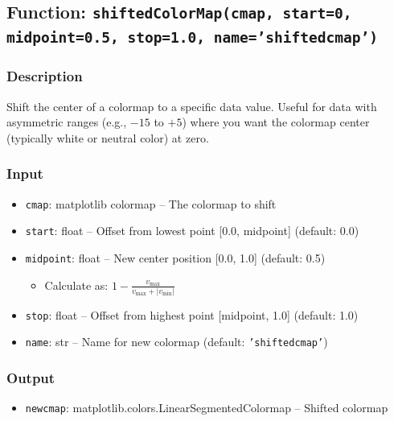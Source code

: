\documentclass[11pt,a4paper]{article}
\begin{document}
\subsection{Function: \texttt{shiftedColorMap(cmap, start=0, midpoint=0.5, stop=1.0, name='shiftedcmap')}}

\subsubsection{Description}
Shift the center of a colormap to a specific data value. Useful for data with asymmetric ranges (e.g., $-15$ to $+5$) where you want the colormap center (typically white or neutral color) at zero.

\subsubsection{Input}
\begin{itemize}[leftmargin=*]
    \item \texttt{cmap}: matplotlib colormap -- The colormap to shift
    \item \texttt{start}: float -- Offset from lowest point [0.0, midpoint] (default: 0.0)
    \item \texttt{midpoint}: float -- New center position [0.0, 1.0] (default: 0.5)
    \begin{itemize}
        \item Calculate as: $1 - \frac{v_{\max}}{v_{\max} + |v_{\min}|}$
    \end{itemize}
    \item \texttt{stop}: float -- Offset from highest point [midpoint, 1.0] (default: 1.0)
    \item \texttt{name}: str -- Name for new colormap (default: \texttt{'shiftedcmap'})
\end{itemize}

\subsubsection{Output}
\begin{itemize}[leftmargin=*]
    \item \texttt{newcmap}: matplotlib.colors.LinearSegmentedColormap -- Shifted colormap
\end{itemize}
\end{document}
